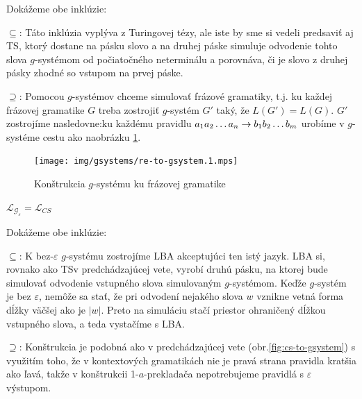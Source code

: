 \begin{dokaz}
  Dokážeme obe inklúzie:
  \begin{description}
    \item{$\subseteq$:} Táto inklúzia vyplýva z Turingovej tézy, ale
      iste by sme si vedeli predsaviť aj TS, ktorý dostane na pásku
      slovo a na druhej páske simuluje odvodenie tohto slova
      $g$-systémom od počiatočného neterminálu a porovnáva, či je slovo
      z druhej pásky zhodné so vstupom na prvej páske.
    \item{$\supseteq$:} Pomocou $g$-systémov chceme simulovať frázové gramatiky, t.j. ku každej
      frázovej gramatike $G$ treba zostrojiť $g$-systém $G'$ taký, že
      $L(G')=L(G)$. $G'$ zostrojíme nasledovne:\newline ku každému
      pravidlu $a_1a_2\dots a_n\rightarrow b_1b_2\dots b_m$ urobíme v
      $g$-systéme cestu ako na\linebreak obrázku \ref{fig:re-to-gsystem}.
  \end{description}
\end{dokaz}

\begin{figure}[!ht]
  \centering
  \texttt{[image: img/gsystems/re-to-gsystem.1.mps]}
  \caption{Konštrukcia $g$-systému ku frázovej gramatike}
  \label{fig:re-to-gsystem}
\end{figure}

\pagebreak

\begin{veta}
  \label{gs_veta_gre2}
  $\mathcal{L}_{\mathcal{G}_\varepsilon}=\mathcal{L}_{CS}$
\end{veta}

\begin{dokaz}
  Dokážeme obe inklúzie:
  \begin{description}
    \item{$\subseteq$:} K bez-$\varepsilon$ $g$-systému zostrojíme LBA
      akceptujúci ten istý jazyk. LBA si, rovnako ako TS\linebreak v
      predchádzajúcej vete, vyrobí druhú pásku, na ktorej bude simulovať
      odvodenie vstupného slova simulovaným $g$-systémom. Keďže
      $g$-systém je bez $\varepsilon$, nemôže sa stať, že pri odvodení
      nejakého slova $w$ vznikne vetná forma dĺžky väčšej ako je $|w|$.
      Preto na simuláciu stačí priestor ohraničený dĺžkou vstupného
      slova, a teda vystačíme s LBA.
      \item{$\supseteq$:} Konštrukcia je podobná ako v predchádzajúcej vete
      (obr.\ref{fig:cs-to-gsystem}) s využitím toho, že v kontextových gramatikách nie
      je pravá strana pravidla kratšia ako ľavá, takže v konštrukcii
      1-$a$-prekladača nepotrebujeme pravidlá s $\varepsilon$ výstupom.
  \end{description}
\end{dokaz}

